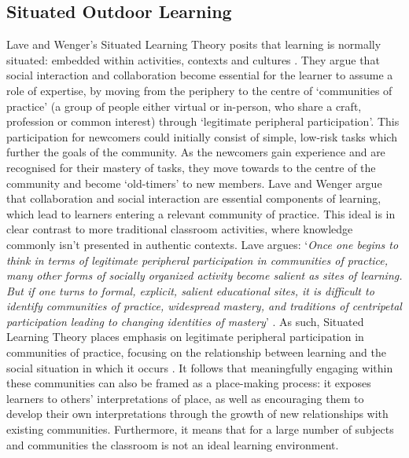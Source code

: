 \subsection{Situated Outdoor Learning}
Lave and Wenger's Situated Learning Theory posits that learning is normally situated: embedded within activities, contexts and cultures \citep{lave1991situated}. They argue that social interaction and collaboration become essential for the learner to assume a role of expertise, by moving from the periphery to the centre of `communities of practice' (a group of people either virtual or in-person, who share a craft, profession or common interest) through `legitimate peripheral participation'. This participation for newcomers could initially consist of simple, low-risk tasks which further the goals of the community. As the newcomers gain experience and are recognised for their mastery of tasks, they move towards to the centre of the community and become `old-timers' to new members. Lave and Wenger argue that collaboration and social interaction are essential components of learning, which lead to learners entering a relevant community of practice. This ideal is in clear contrast to more traditional classroom activities, where knowledge commonly isn't presented in authentic contexts. Lave argues: `\textit{Once one begins to think in terms of legitimate peripheral participation in communities of practice, many other forms of socially organized activity become salient as sites of learning. But if one turns to formal, explicit, salient educational sites, it is difficult to identify communities of practice, widespread mastery, and traditions of centripetal participation leading to changing identities of mastery}' \citep{Lave1991}. As such, Situated Learning Theory places emphasis on legitimate peripheral participation in communities of practice, focusing on the relationship between learning and the social situation in which it occurs \citep{lave1991situated}. It follows that meaningfully engaging within these communities can also be framed as a place-making process: it exposes learners to others' interpretations of place, as well as encouraging them to develop their own interpretations through the growth of new relationships with existing communities. Furthermore, it means that for a large number of subjects and communities the classroom is not an ideal learning environment.


